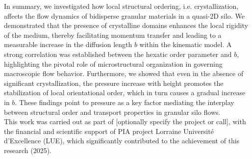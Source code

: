 \documentclass[twocolumn,aps,prl,superscriptaddress,showpacs,byrevtex]{revtex4-2}
\begin{document}
In summary, we investigated how local structural ordering, i.e. crystallization, affects the flow dynamics of bidisperse granular materials in a quasi-2D silo. We demonstrated that the presence of crystalline domains enhances the local rigidity of the medium, thereby facilitating momentum transfer and leading to a measurable increase in the diffusion length $b$ within the kinematic model. A strong correlation was established between the hexatic order parameter and $b$, highlighting the pivotal role of microstructural organization in governing macroscopic flow behavior. Furthermore, we showed that even in the absence of significant crystallization, the pressure increase with height promotes the stabilization of local orientational order, which in turn causes a gradual increase in $b$. These findings point to pressure as a key factor mediating the interplay between structural order and transport properties in granular silo flows.\\

This work was carried out as part of [optionally specify the project or call], with the financial and scientific support of PIA project Lorraine Université d'Excellence (LUE), which significantly contributed to the achievement of this research (2025).


\end{document}
